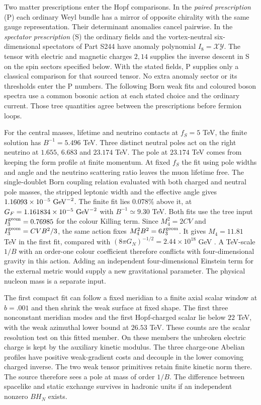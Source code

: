 \documentclass[aps,prd,reprint,onecolumn,nofootinbib,amsmath,amssymb]{revtex4-2}
\begin{document}
Two matter prescriptions enter the Hopf comparisons. In the \emph{paired prescription} (P) each ordinary Weyl bundle has a mirror of opposite chirality with the same gauge representation. Their determinant anomalies cancel pairwise. In the \emph{spectator prescription} (S) the ordinary fields and the vortex-neutral six-dimensional spectators of Part S244 have anomaly polynomial $I_8=\mathcal X\mathcal Y$. The tensor with electric and magnetic charges $2,14$ supplies the inverse descent in S on the spin sectors specified below. With the stated fields, P supplies only a classical comparison for that sourced tensor. No extra anomaly sector or its thresholds enter the P numbers. The following Born weak fits and coloured boson spectra use a common bosonic action at each stated choice and the ordinary current. Those tree quantities agree between the prescriptions before fermion loops.

For the central masses, lifetime and neutrino contacts at $f_S=5$ TeV, the finite solution has $B^{-1}=5.496$ TeV. Three distinct neutral poles act on the right neutrino at $1.655$, $6.683$ and $23.174$ TeV. The pole at $23.174$ TeV comes from keeping the form profile at finite momentum. At fixed $f_S$ the fit using pole widths and angle and the neutrino scattering ratio leaves the muon lifetime free. The single-doublet Born coupling relation evaluated with both charged and neutral pole masses, the stripped leptonic width and the effective angle gives $1.16093\times10^{-5}\ {\rm GeV}^{-2}$. The finite fit lies $0.078\%$ above it, at $G_F=1.161834\times10^{-5}\ {\rm GeV}^{-2}$ with $B^{-1}\simeq9.30$ TeV. Both fits use the tree input $I_3^{\rm geom}=0.76985$ for the colour Killing term. Since $M_4^2=2CV$ and $I_3^{\rm geom}=CVB^2/3$, the same action fixes $M_4^2B^2=6I_3^{\rm geom}$. It gives $M_4=11.81$ TeV in the first fit, compared with $(8\pi G_N)^{-1/2}=2.44\times10^{18}$ GeV \cite{CODATA2022Adjustment}. A TeV-scale $1/B$ with an order-one colour coefficient therefore conflicts with four-dimensional gravity in this action. Adding an independent four-dimensional Einstein term for the external metric would supply a new gravitational parameter. The physical nucleon mass is a separate input.

The first compact fit can follow a fixed meridian to a finite axial scalar window at $b=.001$ and then shrink the weak surface at fixed shape. The first three nonconstant meridian modes and the first Hopf-charged scalar lie below $22$ TeV, with the weak azimuthal lower bound at $26.53$ TeV. These counts are the scalar resolution test on this fitted member. On these members the unbroken electric charge is kept by the auxiliary kinetic modulus. The three charge-one Abelian profiles have positive weak-gradient costs and decouple in the lower comoving charged inverse. The two weak tensor primitives retain finite kinetic norm there. The source therefore sees a pole at mass of order $1/B$. The difference between spacelike and static exchange survives in hadronic units if an independent nonzero $BH_N$ exists.
\end{document}
